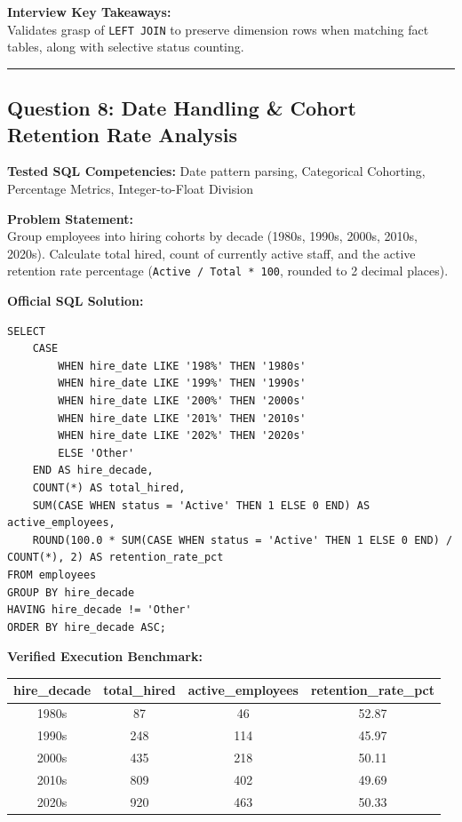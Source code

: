 \documentclass[11pt,a4paper]{article}
\begin{document}
\vspace{0.15cm}
\noindent\textbf{Interview Key Takeaways:} \\
Validates grasp of \texttt{LEFT JOIN} to preserve dimension rows when matching fact tables, along with selective status counting.

\vspace{0.4cm}
\noindent\rule{\textwidth}{0.4pt}
\vspace{0.4cm}

\subsection*{Question 8: Date Handling & Cohort Retention Rate Analysis}

\noindent\textbf{Tested SQL Competencies:} Date pattern parsing, Categorical Cohorting, Percentage Metrics, Integer-to-Float Division

\vspace{0.15cm}
\noindent\textbf{Problem Statement:} \\
Group employees into hiring cohorts by decade (1980s, 1990s, 2000s, 2010s, 2020s). Calculate total hired, count of currently active staff, and the active retention rate percentage (\texttt{Active / Total * 100}, rounded to 2 decimal places).

\vspace{0.25cm}
\noindent\textbf{Official SQL Solution:}
\begin{verbatim}
SELECT 
    CASE 
        WHEN hire_date LIKE '198%' THEN '1980s'
        WHEN hire_date LIKE '199%' THEN '1990s'
        WHEN hire_date LIKE '200%' THEN '2000s'
        WHEN hire_date LIKE '201%' THEN '2010s'
        WHEN hire_date LIKE '202%' THEN '2020s'
        ELSE 'Other'
    END AS hire_decade,
    COUNT(*) AS total_hired,
    SUM(CASE WHEN status = 'Active' THEN 1 ELSE 0 END) AS active_employees,
    ROUND(100.0 * SUM(CASE WHEN status = 'Active' THEN 1 ELSE 0 END) / COUNT(*), 2) AS retention_rate_pct
FROM employees
GROUP BY hire_decade
HAVING hire_decade != 'Other'
ORDER BY hire_decade ASC;
\end{verbatim}

\vspace{0.15cm}
\noindent\textbf{Verified Execution Benchmark:}
\begin{center}
\small
\begin{tabular}{cccc}
\toprule
\textbf{hire\_decade} & \textbf{total\_hired} & \textbf{active\_employees} & \textbf{retention\_rate\_pct} \\
\midrule
1980s & 87 & 46 & 52.87 \\
1990s & 248 & 114 & 45.97 \\
2000s & 435 & 218 & 50.11 \\
2010s & 809 & 402 & 49.69 \\
2020s & 920 & 463 & 50.33 \\
\bottomrule
\end{tabular}
\end{center}
\end{document}
